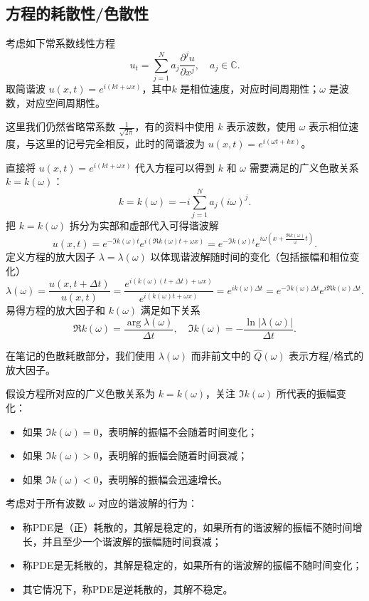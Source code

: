 \subsection{方程的耗散性/色散性}

考虑如下常系数线性方程
\[
    u_t = \sum_{j=1}^N a_j \frac{\partial^j u}{\partial x^j},\quad a_j \in \mathbb{C}.
\]
取简谐波 $u(x,t) = e^{i(k t+\omega x)}$，其中$k$ 是相位速度，对应时间周期性；$\omega$ 是波数，对应空间周期性。

\begin{remark}
    这里我们仍然省略常系数 $\frac{1}{\sqrt{2\pi}}$，有的资料中使用 $k$ 表示波数，使用 $\omega$ 表示相位速度，与这里的记号完全相反，此时的简谐波为 $u(x,t) = e^{i(\omega t+k x)}$。
\end{remark}

直接将 $u(x,t) = e^{i(k t+\omega x)}$ 代入方程可以得到 $k$ 和 $\omega$ 需要满足的广义色散关系 $k=k(\omega)$：
\[
    k = k(\omega) =  - i \sum_{j=1}^N a_j (i \omega)^j.
\]
把 $k = k(\omega)$ 拆分为实部和虚部代入可得谐波解
\[
    u(x,t) = e^{-\Im k(\omega) t} e^{i(\Re k(\omega) t + \omega x)} = e^{-\Im k(\omega) t} e^{i \omega(x + \frac{\Re k(\omega)}\omega t)}.
\]
定义方程的放大因子 $\lambda = \lambda(\omega)$ 以体现谐波解随时间的变化（包括振幅和相位变化）
\[
    \lambda(\omega) = \frac{u(x,t+\Delta t)}{u(x,t)} = \frac{e^{i(k(\omega) (t+\Delta t)+\omega x)}}{e^{i(k(\omega) t+\omega x)}} = e^{i k(\omega) \Delta t}
    = e^{-\Im k(\omega) \Delta t} e^{i \Re k(\omega) \Delta t}.
\]
易得方程的放大因子和 $k(\omega)$ 满足如下关系
\[
    \Re k(\omega) = \frac{\arg \lambda(\omega)}{\Delta t},\quad
    \Im k(\omega) = - \frac{\ln |\lambda(\omega)|}{\Delta t}.
\]

\begin{remark}
    在笔记的色散耗散部分，我们使用 $\lambda(\omega)$ 而非前文中的 $\widehat{Q}(\omega)$ 表示方程/格式的放大因子。
\end{remark}

假设方程所对应的广义色散关系为 $k=k(\omega)$，关注 $\Im k(\omega)$ 所代表的振幅变化：
\begin{itemize}
    \item 如果 $\Im k(\omega) = 0$，表明解的振幅不会随着时间变化；
    \item 如果 $\Im k(\omega) > 0$，表明解的振幅会随着时间衰减；
    \item 如果 $\Im k(\omega) < 0$，表明解的振幅会迅速增长。
\end{itemize}

\begin{definition}[方程的耗散性]
    考虑对于所有波数 $\omega$ 对应的谐波解的行为：
    \begin{itemize}
        \item 称PDE是（正）耗散的，其解是稳定的，如果所有的谐波解的振幅不随时间增长，并且至少一个谐波解的振幅随时间衰减；
        \item 称PDE是无耗散的，其解是稳定的，如果所有的谐波解的振幅不随时间变化；
        \item 其它情况下，称PDE是逆耗散的，其解不稳定。
    \end{itemize}
\end{definition}

